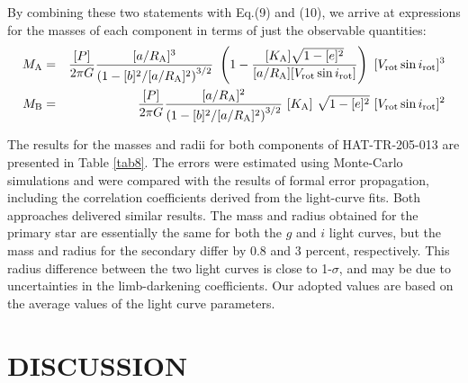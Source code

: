 \documentclass[12pt, preprint]{aastex}
\begin{document}
By combining these two statements with Eq.(9) and (10), we arrive at expressions for the masses of each component in terms of just the observable quantities:
\begin{eqnarray}
M_{\rm A} & = & \frac{[P]}{2\pi G} \frac{[a/R_{\rm A}]^3}{\left(1-[b]^2/[a/R_{\rm A}]^2\right)^{3/2}}\ \left(1 - \frac{[K_{\rm A}]\sqrt{1-[e]^2}}{[a/R_{\rm A}] [V_{\rm rot} \sin i_{\rm rot}]}\right)\ [V_{\rm rot} \sin i_{\rm rot}]^3\\
M_{\rm B} & = & \frac{[P]}{2 \pi G} \frac{[a/R_{\rm A}]^2}{\left(1-[b]^2/[a/R_{\rm A}]^2\right)^{3/2}}\ [K_{\rm A}]\ \sqrt{1-[e]^2}\ [V_{\rm rot} \sin i_{\rm rot}]^2
\end{eqnarray}  

The results for the masses and radii for both components of
HAT-TR-205-013 are presented in Table \ref{tab8}. The errors were
estimated using Monte-Carlo simulations and were compared with the
results of formal error propagation, including the correlation
coefficients derived from the light-curve fits. Both approaches
delivered similar results. The mass and radius obtained for the
primary star are essentially the same for both the $g$ and $i$ light
curves, but the mass and radius for the secondary differ by 0.8 and 3
percent, respectively. This radius difference between the two light
curves is close to 1-$\sigma$, and may be due to uncertainties in the
limb-darkening coefficients. Our adopted values are based on the average values of the light curve parameters.

\section{DISCUSSION}
\end{document}
